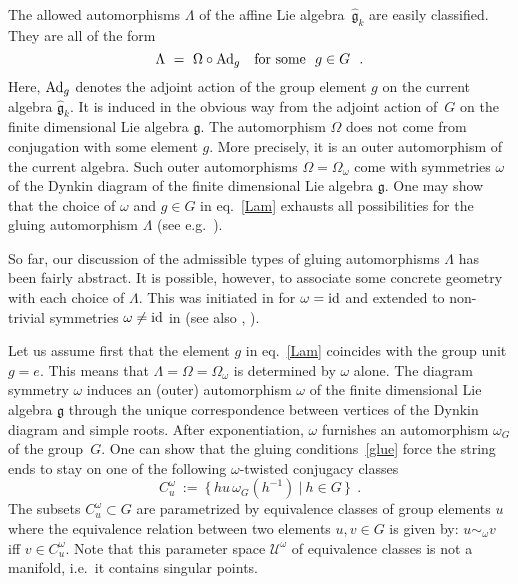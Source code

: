 \documentclass[12pt,a4paper]{article}
\newcommand{\mf}{\mathfrak} %
\def\U{{\mathcal U}}
\def\asg{{\hat{\mf{g}}}}
\def\Ad{{\rm Ad}}
\def\id{{\rm id}}
\begin{document}
The allowed automorphisms $\Lambda$ of the affine Lie algebra~$\asg_k$
are easily classified. They are all of the form 
\begin{equation}
  \label{Lam}
  \Lambda \ = \ \Omega \circ \Ad_g \ \ 
  \text{ for some } \  g \in G \ \ . 
\end{equation}
Here, $\Ad_g$ denotes the adjoint action of the group element 
$g$ on the current algebra $\asg_k$. It is induced in the 
obvious way from the adjoint action of~$G$ on the finite 
dimensional Lie algebra $\mf{g}$. The automorphism $\Omega$ 
does not come from conjugation with some element $g$. More 
precisely, it is an outer automorphism of the current 
algebra. Such outer automorphisms $\Omega = \Omega_\omega$ 
come with symmetries $\omega$ of the Dynkin diagram of the 
finite dimensional Lie algebra $\mf{g}$. One may show that 
the choice of $\omega$ and $g \in G$ in eq.~\eqref{Lam} 
exhausts all possibilities for the gluing automorphism
$\Lambda$ (see e.g.~\cite{Kac:1990}). 
\medskip

So far, our discussion of the admissible types of gluing 
automorphisms $\Lambda$ has been fairly abstract. It is 
possible, however, to associate some concrete geometry 
with each choice of $\Lambda$. This was initiated in 
\cite{Alekseev:1998mc} for $\omega = \id$ and extended to 
non-trivial symmetries $\omega \neq \id$ in \cite{Felder:1999ka} 
(see also \cite{Gawedzki:1999bq}, \cite{Stanciu:1999id}). 
\smallskip

Let us assume first that the element $g$ in eq.~\eqref{Lam}
coincides with the group unit $g = e$. This means that $\Lambda
= \Omega = \Omega_\omega$ is determined by $\omega$ alone. The
diagram symmetry $\omega$ induces an (outer) automorphism 
$\omega$ of the finite dimensional Lie algebra $\mf{g}$ through 
the unique correspondence between vertices of the Dynkin diagram 
and simple roots. After exponentiation, $\omega$ furnishes
an automorphism $\omega_G$ of the group~$G$. One can show that 
the gluing conditions~\eqref{glue} force the string ends to 
stay on one of the following $\omega$-twisted conjugacy 
classes
$$ C^\omega_u \ := \ \{\,  h u\,  \omega_G(h^{-1})\ |\ h \in G 
\, \} \ \ . $$
The subsets $C^\omega_u \subset G$ are parametrized 
by equivalence classes of group elements $u$ where the 
equivalence relation between two elements $u,v \in G$ is
given by: $u \sim_\omega v$ iff $v \in C^\omega_u$. Note 
that this parameter space $\U^\omega$ of equivalence classes
is not a manifold, i.e.\ it contains singular points.  
\smallskip
\end{document}
